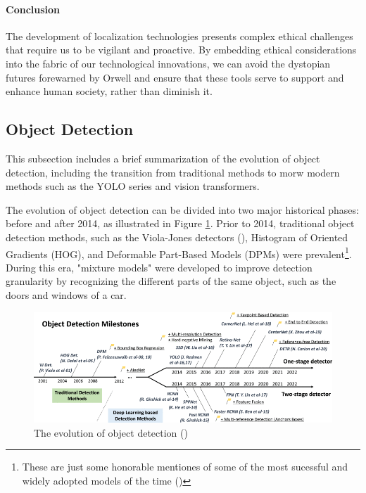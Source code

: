 \paragraph{Conclusion}
The development of localization technologies presents complex ethical challenges that require us to be vigilant and proactive. By embedding ethical considerations into the fabric of our technological innovations, we can avoid the dystopian futures forewarned by Orwell and ensure that these tools serve to support and enhance human society, rather than diminish it.

\subsection{Object Detection}
\label{sec:object_detection}
This subsection includes a brief summarization of the evolution of object detection, including the transition from traditional methods to morw modern methods such as the YOLO series and vision transformers.

The evolution of object detection can be divided into two major historical phases: before and after 2014, as illustrated in Figure \ref{fig:object_detect_20_years}. Prior to 2014, traditional object detection methods, such as the Viola-Jones detectors (\cite{vi2001viola-jones-orig}), Histogram of Oriented Gradients (HOG), and Deformable Part-Based Models (DPMs) were prevalent\footnote{These are just some honorable mentiones of some of the most sucessful and widely adopted models of the time (\cite{li2012violajonessuccessful})}. During this era, "mixture models" were developed to improve detection granularity by recognizing the different parts of the same object, such as the doors and windows of a car.

\begin{figure}[H]
    \centering
    \includegraphics[width=1\linewidth]{Images/Diagrams/object_detection_20years.png}
    \caption{The evolution of object detection (\cite{zou2023object_detection_in_20_years})}
    \label{fig:object_detect_20_years}
\end{figure}

